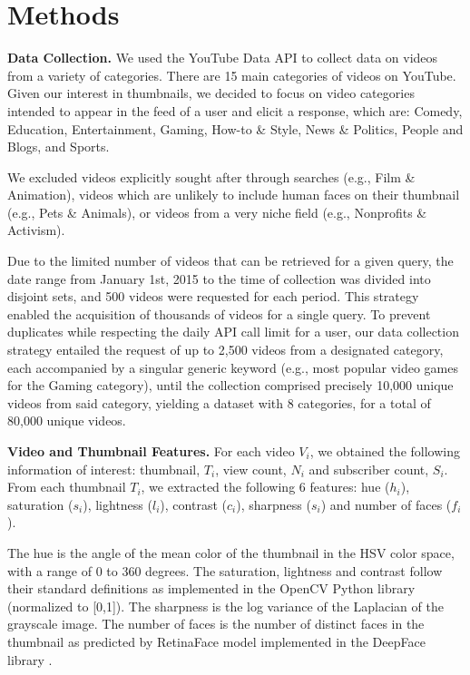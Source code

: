 \documentclass{article}
\begin{document}
\section{Methods}
\textbf{Data Collection.} We used the YouTube Data API \cite{youtubeapi} to collect data on videos from a variety of categories. There are 15 main categories of videos on YouTube. Given our interest in thumbnails, we decided to focus on video categories intended to appear in the feed of a user and elicit a response, which are: Comedy, Education, Entertainment, Gaming, How-to \& Style, News \& Politics, People and Blogs, and Sports.

We excluded videos explicitly sought after through searches (e.g., Film \& Animation), videos which are unlikely to include human faces on their thumbnail (e.g., Pets \& Animals), or videos from a very niche field (e.g., Nonprofits \& Activism).

Due to the limited number of videos that can be retrieved for a given query, the date range from January 1st, 2015 to the time of collection was divided into disjoint sets, and 500 videos were requested for each period. This strategy enabled the acquisition of thousands of videos for a single query. To prevent duplicates while respecting the daily API call limit for a user, our data collection strategy entailed the request of up to 2,500 videos from a designated category, each accompanied by a singular generic keyword (e.g., most popular video games for the Gaming category), until the collection comprised precisely 10,000 unique videos from said category, yielding a dataset with 8 categories, for a total of 80,000 unique videos.



\textbf{Video and Thumbnail Features.} For each video $V_i$, we obtained the following information of interest: thumbnail, $T_i$, view count, $N_i$ and subscriber count, $S_i$. From each thumbnail $T_{i}$, we extracted the following 6 features: hue ($h_{i}$), saturation ($s_{i}$), lightness ($l_{i}$), contrast ($c_{i}$), sharpness ($s_{i}$) and number of faces ($f_{i}$).

The hue is the angle of the mean color of the thumbnail in the HSV color space, with a range of 0 to 360 degrees. The saturation, lightness and contrast follow their standard definitions as implemented in the OpenCV Python library (normalized to [0,1]). The sharpness is the log variance of the Laplacian of the grayscale image. The number of faces is the number of distinct faces in the thumbnail as predicted by RetinaFace model implemented in the DeepFace library \cite{serengil2024lightface,serengil2020lightface}.
\end{document}
